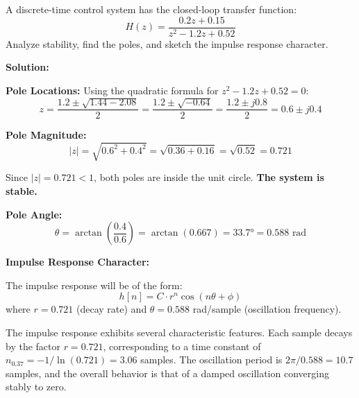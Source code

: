 \begin{example}
A discrete-time control system has the closed-loop transfer function:
\begin{equation}
H(z) = \frac{0.2z + 0.15}{z^2 - 1.2z + 0.52}
\end{equation}
Analyze stability, find the poles, and sketch the impulse response character.

\textbf{Solution:}

\textbf{Pole Locations:}
Using the quadratic formula for $z^2 - 1.2z + 0.52 = 0$:
\begin{equation}
z = \frac{1.2 \pm \sqrt{1.44 - 2.08}}{2} = \frac{1.2 \pm \sqrt{-0.64}}{2} = \frac{1.2 \pm j0.8}{2} = 0.6 \pm j0.4
\end{equation}

\textbf{Pole Magnitude:}
\begin{equation}
|z| = \sqrt{0.6^2 + 0.4^2} = \sqrt{0.36 + 0.16} = \sqrt{0.52} = 0.721
\end{equation}

Since $|z| = 0.721 < 1$, both poles are inside the unit circle. \textbf{The system is stable.}

\textbf{Pole Angle:}
\begin{equation}
\theta = \arctan\left(\frac{0.4}{0.6}\right) = \arctan(0.667) = 33.7° = 0.588 \text{ rad}
\end{equation}

\textbf{Impulse Response Character:}

The impulse response will be of the form:
\begin{equation}
h[n] = C \cdot r^n \cos(n\theta + \phi)
\end{equation}
where $r = 0.721$ (decay rate) and $\theta = 0.588$ rad/sample (oscillation frequency).

The impulse response exhibits several characteristic features. Each sample decays by the factor $r = 0.721$, corresponding to a time constant of $n_{0.37} = -1/\ln(0.721) = 3.06$ samples. The oscillation period is $2\pi/0.588 = 10.7$ samples, and the overall behavior is that of a damped oscillation converging stably to zero.

\begin{figure}[H]
\centering
{}
\end{figure}
\end{example}
